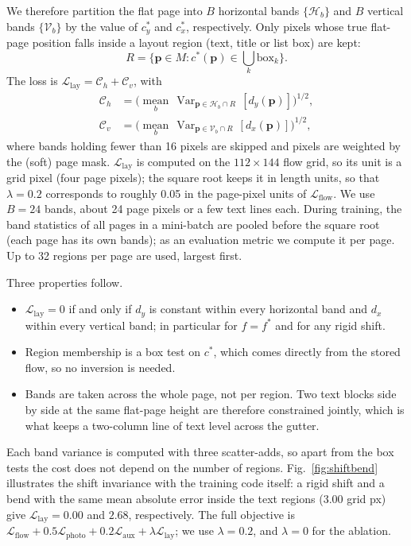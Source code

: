 \documentclass[conference]{IEEEtran}
\newcommand{\Llay}{\mathcal{L}_{\mathrm{lay}}}
\newcommand{\Lflow}{\mathcal{L}_{\mathrm{flow}}}
\newcommand{\Lphoto}{\mathcal{L}_{\mathrm{photo}}}
\newcommand{\Laux}{\mathcal{L}_{\mathrm{aux}}}
\newcommand{\Cm}{\mathcal{C}}
\begin{document}
We therefore partition the flat page into $B$ horizontal bands $\{\mathcal{H}_b\}$ and $B$ vertical bands $\{\mathcal{V}_b\}$ by the value of $c^*_y$ and $c^*_x$, respectively. Only pixels whose true flat-page position falls inside a layout region (text, title or list box) are kept:
\begin{equation}
R = \{\mathbf{p} \in M : c^*(\mathbf{p}) \in \textstyle\bigcup_k \mathrm{box}_k\}.
\end{equation}
The loss is $\Llay = \Cm_h + \Cm_v$, with
\begin{equation}
\begin{aligned}
\Cm_h &= \Big(\operatorname*{mean}_{b}\, \operatorname{Var}_{\mathbf{p}\in \mathcal{H}_b\cap R}\,[d_y(\mathbf{p})]\Big)^{1/2},\\
\Cm_v &= \Big(\operatorname*{mean}_{b}\, \operatorname{Var}_{\mathbf{p}\in \mathcal{V}_b\cap R}\,[d_x(\mathbf{p})]\Big)^{1/2},
\end{aligned}
\label{eq:lay}
\end{equation}
where bands holding fewer than 16 pixels are skipped and pixels are weighted by the (soft) page mask. $\Llay$ is computed on the $112\times144$ flow grid, so its unit is a grid pixel (four page pixels); the square root keeps it in length units, so that $\lambda=0.2$ corresponds to roughly 0.05 in the page-pixel units of $\Lflow$. We use $B=24$ bands, about 24 page pixels or a few text lines each. During training, the band statistics of all pages in a mini-batch are pooled before the square root (each page has its own bands); as an evaluation metric we compute it per page. Up to 32 regions per page are used, largest first.

Three properties follow.
\begin{itemize}
\item $\Llay=0$ if and only if $d_y$ is constant within every horizontal band and $d_x$ within every vertical band; in particular for $f=f^*$ and for any rigid shift.
\item Region membership is a box test on $c^*$, which comes directly from the stored flow, so no inversion is needed.
\item Bands are taken across the whole page, not per region. Two text blocks side by side at the same flat-page height are therefore constrained jointly, which is what keeps a two-column line of text level across the gutter.
\end{itemize}
Each band variance is computed with three scatter-adds, so apart from the box tests the cost does not depend on the number of regions. Fig.~\ref{fig:shiftbend} illustrates the shift invariance with the training code itself: a rigid shift and a bend with the same mean absolute error inside the text regions (3.00 grid px) give $\Llay=0.00$ and $2.68$, respectively. The full objective is $\Lflow + 0.5\Lphoto + 0.2\Laux + \lambda\Llay$; we use $\lambda=0.2$, and $\lambda=0$ for the ablation.
\end{document}
